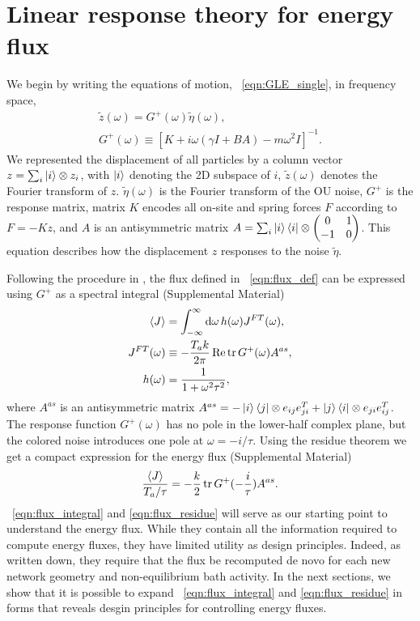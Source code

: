 \documentclass[
 preprint,
 preprintnumbers,
 amsmath,amssymb,
 aps,
 pre,
 longbibliography,
 superscriptaddress,
 10pt, twocolumn
]{revtex4-1}
\begin{document}
\section{Linear response theory for energy flux} \label{sec:linear_response}
We begin by writing the equations of motion, \eqnname~\eqref{eqn:GLE_single}, in frequency space,
\begin{gather} \label{eqn:response}
    \tilde{z}(\omega) = G^+(\omega) \tilde{\eta}(\omega), \\
    G^{+}(\omega) \equiv [K + i\omega(\gamma I + BA) - m\omega^2I]^{-1}.
\end{gather}
We represented the displacement of all particles by a column vector $z=\sum_i \ket{i}\otimes z_i$, with $\ket{i}$ denoting the 2D subspace of $i$, $\tilde{z}(\omega)$ denotes the Fourier transform of $z$. $\tilde{\eta}(\omega)$ is the Fourier transform of the OU noise, $G^+$ is the response matrix, matrix $K$ encodes all on-site and spring forces $F$ according to $F=-Kz$, and $A$ is an antisymmetric matrix $A=\sum_i \ket{i}\bra{i}\otimes \mqty(0 & 1 \\ -1 & 0)$. This equation describes how the displacement $z$ responses to the noise $\tilde{\eta}$.

Following the procedure in \cite{Kundu2011LargeDeviations}, the flux defined in \eqnname~\eqref{eqn:flux_def} can be expressed using $G^+$ as a spectral integral (Supplemental Material)
\begin{align}
    \expval{J} &= \int_{-\infty}^\infty \dd{\omega} h(\omega) J^{FT}(\omega), \label{eqn:flux_integral} \\
    J^{FT}(\omega) &\equiv -\frac{T_a k}{2\pi} \Re \tr G^+(\omega)A^{as}, \\
    h(\omega) &= \frac{1}{1+\omega^2\tau^2},
\end{align}
where $A^{as}$ is an antisymmetric matrix
$A^{as} = -\ket{i}\bra{j} \otimes e_{ij}e_{ji}^T + \ket{j}\bra{i} \otimes e_{ji}e_{ij}^T$.
The response function $G^+(\omega)$ has no pole in the lower-half complex plane, but the colored noise introduces one pole at $\omega = -i/\tau$. Using the residue theorem we get a compact expression for the energy flux (Supplemental Material)
\begin{equation} \label{eqn:flux_residue}
    \frac{\expval{J}}{T_a/\tau} = -\frac{k}{2} \tr G^+(-\frac{i}{\tau})A^{as} .
\end{equation}
\eqnname~\eqref{eqn:flux_integral} and \eqref{eqn:flux_residue} will serve as our starting point to understand the energy flux. While they contain all the information required to compute energy fluxes, they have limited utility as design principles. Indeed, as written down, they require that the flux be recomputed de novo for each new network geometry and non-equilibrium bath activity. In the next sections, we show that it is possible to expand \eqnname~\eqref{eqn:flux_integral} and \eqref{eqn:flux_residue} in forms that reveals desgin principles for controlling energy fluxes.
\end{document}
